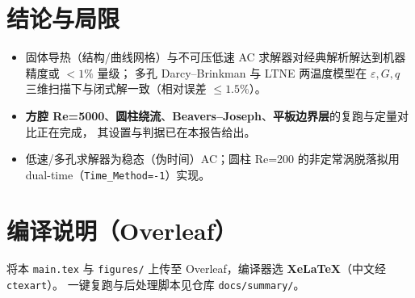 \documentclass[11pt]{ctexart}
\begin{document}
\section{结论与局限}
\begin{itemize}
\item 固体导热（结构/曲线网格）与不可压低速 AC 求解器对经典解析解达到机器精度或 $<1\%$ 量级；
多孔 Darcy--Brinkman 与 LTNE 两温度模型在 $\varepsilon,G,q$ 三维扫描下与闭式解一致（相对误差 $\le1.5\%$）。
\item \textbf{方腔 Re=5000}、\textbf{圆柱绕流}、\textbf{Beavers--Joseph}、\textbf{平板边界层}的复跑与定量对比正在完成，
其设置与判据已在本报告给出。
\item 低速/多孔求解器为稳态（伪时间）AC；圆柱 Re=200 的非定常涡脱落拟用 dual-time（\texttt{Time\_Method=-1}）实现。
\end{itemize}

\section{编译说明（Overleaf）}
将本 \texttt{main.tex} 与 \texttt{figures/} 上传至 Overleaf，编译器选 \textbf{XeLaTeX}（中文经 \texttt{ctexart}）。
一键复跑与后处理脚本见仓库 \texttt{docs/summary/}。
\end{document}
